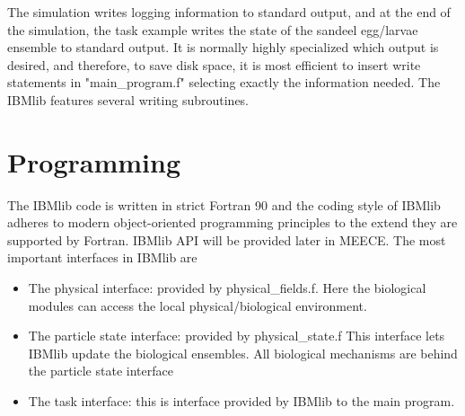The simulation writes logging information to standard output, and at the 
end of the simulation, the task example writes the state of the sandeel egg/larvae
ensemble to standard output. It is normally highly specialized which output
is desired, and therefore, to save disk space, it is most efficient to 
insert write statements in "main\_program.f" selecting exactly the information needed.
The IBMlib features several writing subroutines.

\section{Programming}

The IBMlib code is written in strict Fortran 90 and the coding style of 
IBMlib adheres to modern object-oriented programming principles 
to the extend they are supported by Fortran.
IBMlib API will be provided later in MEECE. The most important interfaces 
in IBMlib are
\begin{itemize}
  \item The physical interface: provided by physical\_fields.f. Here
        the biological modules can access the local physical/biological environment.
  \item The particle state interface: provided by physical\_state.f 
        This interface lets IBMlib update the biological ensembles.
        All biological mechanisms are behind the particle state interface 
  \item The task interface: this is interface provided by IBMlib to the
        main program.
\end{itemize}

   

